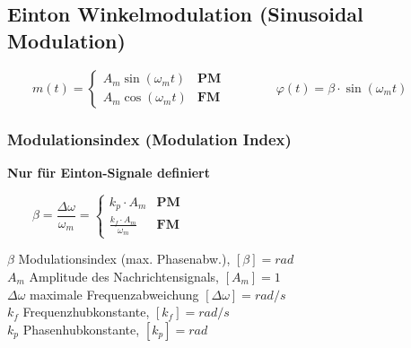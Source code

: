 \subsection{Einton Winkelmodulation (Sinusoidal Modulation) }
	\begin{minipage}[t][0.7cm][c]{10cm}
		$ \qquad m(t) = \begin{cases}
          	A_m \sin(\omega_m t)  & \textbf{PM}\\
          	A_m \cos(\omega_m t)  & \textbf{FM}
          \end{cases}  
		\qquad \qquad \varphi(t) = \beta \cdot \sin(\omega_m t)$
\end{minipage}


\subsubsection{Modulationsindex (Modulation Index)}
\textbf{Nur für Einton-Signale definiert}\\
\begin{minipage}[t][0.7cm][c]{8cm}
	$ \qquad
	\beta = \dfrac{\Delta \omega}{\omega_m} =
	\begin{cases}
	k_p \cdot A_m & \textbf{PM}  \\
	\frac{k_f \cdot A_m}{\omega_m} & \textbf{FM}
	\end{cases}$ \\
\end{minipage}
\begin{minipage}[t][0.7cm][c]{8cm}
	$\beta$ Modulationsindex (max. Phasenabw.), $[\beta] = rad$ \\
	$A_m$ Amplitude des Nachrichtensignals, $[A_m] = 1$ \\
	$\Delta \omega$ maximale Frequenzabweichung $[\Delta \omega] = rad/s$ \\
	$k_f$ Frequenzhubkonstante, $[k_f] = rad/s$ \\
	$k_p$ Phasenhubkonstante, $[k_p] = rad$
\end{minipage}\\ \\ \\





